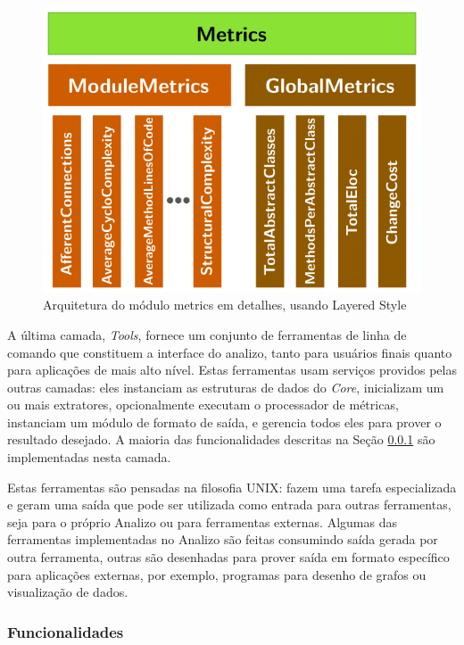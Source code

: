 \begin{figure}[H]
\center
\includegraphics[scale=0.4]{imagens/analizo-metrics-architecture.png}
\caption{Arquitetura do módulo metrics em detalhes, usando Layered Style \cite{Clements2002}}
\label{arquitetura-metrics-analizo}
\end{figure}

A última camada, {\it Tools}, fornece um conjunto de ferramentas de linha de comando que
constituem a interface do analizo, tanto para usuários finais quanto para
aplicações de mais alto nível. Estas ferramentas usam serviços providos pelas
outras camadas: eles instanciam as estruturas de dados do {\it Core},
inicializam um ou mais extratores, opcionalmente executam o processador de
métricas, instanciam um módulo de formato de saída, e gerencia todos eles para
prover o resultado desejado. A maioria das funcionalidades descritas na Seção
\ref{funcionalidades} são implementadas nesta camada.

Estas ferramentas são pensadas na filosofia UNIX: fazem uma tarefa
especializada e geram uma saída que pode ser utilizada como entrada para outras
ferramentas, seja para o próprio Analizo ou para ferramentas externas. Algumas
das ferramentas implementadas no Analizo são feitas consumindo saída gerada por
outra ferramenta, outras são desenhadas para prover saída em formato específico
para aplicações externas, por exemplo, programas para desenho de grafos ou
visualização de dados.

\subsubsection{Funcionalidades}\label{funcionalidades}

